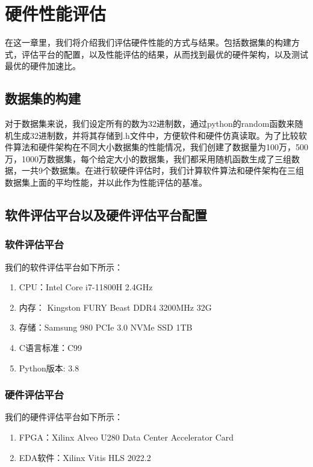 
\chapter{硬件性能评估}
在这一章里，我们将介绍我们评估硬件性能的方式与结果。包括数据集的构建方式，评估平台的配置，以及性能评估的结果，从而找到最优的硬件架构，以及测试最优的硬件加速比。

\section{数据集的构建}

对于数据集来说，我们设定所有的数为32进制数，通过python的random函数来随机生成32进制数，并将其存储到.h文件中，方便软件和硬件仿真读取。为了比较软件算法和硬件架构在不同大小数据集的性能情况，我们创建了数据量为100万，500万，1000万数据集，每个给定大小的数据集，我们都采用随机函数生成了三组数据，一共9个数据集。在进行软硬件评估时，我们计算软件算法和硬件架构在三组数据集上面的平均性能，并以此作为性能评估的基准。

\section{软件评估平台以及硬件评估平台配置}

\subsection{软件评估平台}
我们的软件评估平台如下所示：
\begin{enumerate}
    \item CPU：Intel Core i7-11800H 2.4GHz
    \item 内存： Kingston FURY Beast DDR4 3200MHz 32G
    \item 存储：Samsung 980 PCIe 3.0 NVMe SSD 1TB
    \item C语言标准：C99
    \item Python版本: 3.8
\end{enumerate}

\subsection{硬件评估平台}
\begin{table}[htbp]
\centering
\caption{XCU280 FPGA可利用资源表}
\label{table:fpga_resource}
\end{table}
我们的硬件评估平台如下所示：
\begin{enumerate}
    \item FPGA：Xilinx Alveo U280 Data Center Accelerator Card
    \item EDA软件：Xilinx Vitis HLS 2022.2
\end{enumerate}

